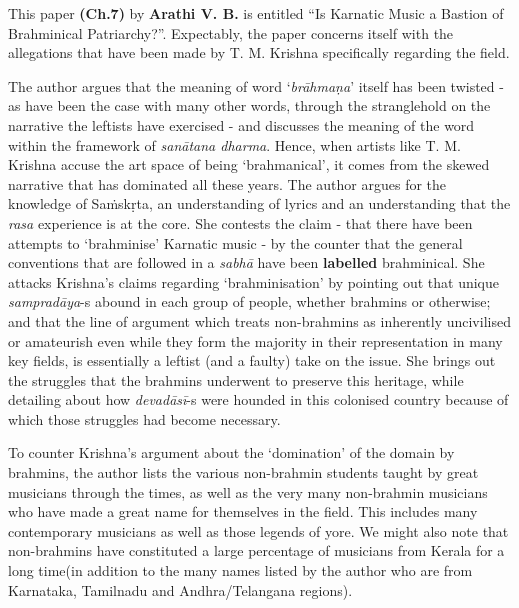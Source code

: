 This paper \textbf{(Ch.7)} by \textbf{Arathi V. B.} is entitled “Is Karnatic Music a Bastion of Brahminical Patriarchy?”. Expectably, the paper concerns itself with the allegations that have been made by T. M. Krishna specifically regarding the field.

The author argues that the meaning of word ‘\textit{brāhmaṇa}’ itself has been twisted - as have been the case with many other words, through the stranglehold on the narrative the leftists have exercised - and discusses the meaning of the word within the framework of \textit{sanātana dharma}. Hence, when artists like T. M. Krishna accuse the art space of being ‘brahmanical’, it comes from the skewed narrative that has dominated all these years. The author argues for the knowledge of Saṁskṛta, an understanding of lyrics and an understanding that the \textit{rasa} experience is at the core. She contests the claim - that there have been attempts to ‘brahminise’ Karnatic music - by the counter that the general conventions that are followed in a \textit{sabhā} have been \textbf{labelled} brahminical. She attacks Krishna’s claims regarding ‘brahminisation’ by pointing out that unique \textit{sampradāya}-s abound in each group of people, whether brahmins or otherwise; and that the line of argument which treats non-brahmins as inherently uncivilised or amateurish even while they form the majority in their representation in many key fields, is essentially a leftist (and a faulty) take on the issue. She brings out the struggles that the brahmins underwent to preserve this heritage, while detailing about how \textit{devadāsī}-s were hounded in this colonised country because of which those struggles had become necessary.

To counter Krishna’s argument about the ‘domination’ of the domain by brahmins, the author lists the various non-brahmin students taught by great musicians through the times, as well as the very many non-brahmin musicians who have made a great name for themselves in the field. This includes many contemporary musicians as well as those legends of yore. We might also note that non-brahmins have constituted a large percentage of musicians from Kerala for a long time(in addition to the many names listed by the author who are from Karnataka, Tamilnadu and Andhra/Telangana regions).

